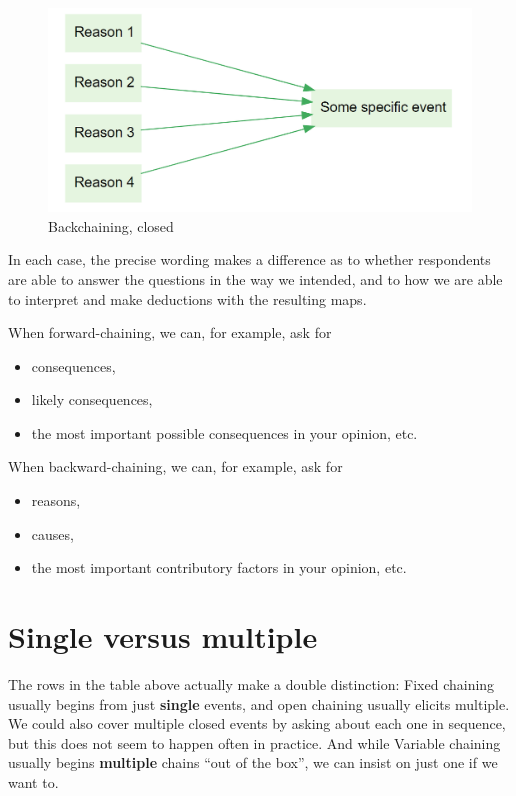 \documentclass[
]{book}
\providecommand{\tightlist}{%
  \setlength{\itemsep}{0pt}\setlength{\parskip}{0pt}}
\begin{document}
\begin{figure}
\centering
\includegraphics{_assets/image-20210215090049648.png}
\caption{Backchaining, closed}
\end{figure}

In each case, the precise wording makes a difference as to whether respondents are able to answer the questions in the way we intended, and to how we are able to interpret and make deductions with the resulting maps.

When forward-chaining, we can, for example, ask for

\begin{itemize}
\tightlist
\item
  consequences,
\item
  likely consequences,
\item
  the most important possible consequences in your opinion, etc.
\end{itemize}

When backward-chaining, we can, for example, ask for

\begin{itemize}
\tightlist
\item
  reasons,
\item
  causes,
\item
  the most important contributory factors in your opinion, etc.
\end{itemize}

\hypertarget{single-versus-multiple}{%
\section{Single versus multiple}\label{single-versus-multiple}}

The rows in the table above actually make a double distinction: Fixed chaining usually begins from just \textbf{single} events, and open chaining usually elicits multiple. We could also cover multiple closed events by asking about each one in sequence, but this does not seem to happen often in practice. And while Variable chaining usually begins \textbf{multiple} chains ``out of the box'', we can insist on just one if we want to.
\end{document}
